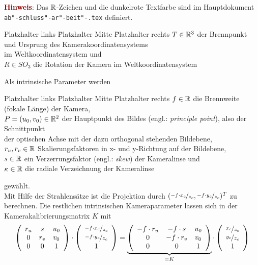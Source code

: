 \noindent \textbf{\textcolor{darkred}{Hinweis}}: Das $\mathbb R$-Zeichen und die dunkelrote Textfarbe sind im Hauptdokument \texttt{ab"-schluss"-ar"-beit"-.tex} definiert.
\begin{tabbing}
	Platzhalter links \quad \= Platzhalter Mitte \quad \= Platzhalter rechts \kill
	$T \in \mathbb R^3$  \> der Brennpunkt und Ursprung des Kamerakoordinatensystems \\
	\> im Weltkoordinatensystem und                             \\
	$R \in SO_3$     \> die Rotation der Kamera im Weltkoordinatensystem
\end{tabbing}
Als intrinsische Parameter werden
\begin{tabbing}
	Platzhalter links \quad \= Platzhalter Mitte \quad \= Platzhalter rechts \kill
	$f \in \mathbb R$             \> die Brennweite (fokale Länge) der Kamera,                                          \\
	$P=(u_0,v_0) \in \mathbb R^2$ \> der Hauptpunkt des Bildes (engl.: \textit{principle point}), also der Schnittpunkt \\
	\> der optischen Achse mit der dazu orthogonal stehenden Bildebene,                   \\
	$r_u,r_v \in \mathbb R$       \> Skalierungsfaktoren in x- und y-Richtung auf der Bildebene,                        \\
	$s \in \mathbb R$             \> ein Verzerrungsfaktor (engl.: \textit{skew}) der Kameralinse und                   \\
	$\kappa \in \mathbb R$        \> die radiale Verzeichnung der Kameralinse
\end{tabbing}
gewählt.\\
%
Mit Hilfe der Strahlensätze ist die Projektion durch $(\nicefrac{-f \cdot x_c}{z_c}, \nicefrac{-f \cdot y_c}{z_c})^T$ zu berechnen. Die restlichen intrinsischen Kameraparameter lassen sich in der Kamerakalibrierungsmatrix $K$ mit
\begin{equation}
	\label{eqn:K}
	\left(\begin{array}{ccc}r_u&s&u_0\\0&r_v&v_0\\0&0&1 \end{array}\right) \cdot 
	\left(\begin{array}{c}\nicefrac{-f \cdot x_c}{z_c}\\\nicefrac{-f \cdot y_c}{z_c}\\1\end{array}\right) = 
	\underbrace{\left(\begin{array}{ccc}-f \cdot r_u&-f \cdot s&u_0\\0&-f \cdot r_v&v_0\\0&0&1 \end{array}\right)}_{=K} \cdot 
	\left(\begin{array}{c}\nicefrac{x_c}{z_c}\\\nicefrac{y_c}{z_c}\\1\end{array}\right)
\end{equation}

